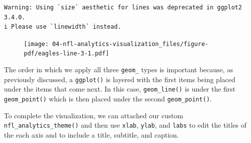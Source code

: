 \documentclass[
  letterpaper,
]{krantz}
\begin{document}
\begin{verbatim}
Warning: Using `size` aesthetic for lines was deprecated in ggplot2 3.4.0.
i Please use `linewidth` instead.
\end{verbatim}

\begin{figure}[H]

{\centering \texttt{[image: 04-nfl-analytics-visualization\_files/figure-pdf/eagles-line-3-1.pdf]}

}

\end{figure}

The order in which we apply all three \texttt{geom\_} types is important
because, as previously discussed, a \texttt{ggplot()} is layered with
the first items being placed under the items that come next. In this
case, \texttt{geom\_line()} is under the first \texttt{geom\_point()}
which is then placed under the second \texttt{geom\_point()}.

To complete the visualization, we can attached our custom
\texttt{nfl\_analytics\_theme()} and then use \texttt{xlab},
\texttt{ylab}, and \texttt{labs} to edit the titles of the each axis and
to include a title, subtitle, and caption.
\end{document}
